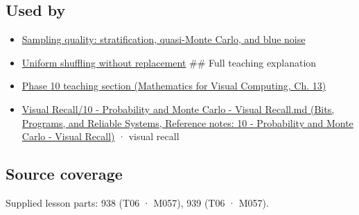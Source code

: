 \subsection{Used by}\label{appendix-daaf25bfd3a0-used-by}

\hypertarget{appendix-daaf25bfd3a0-used-by}{}

\begin{itemize}
\item
  \hyperref[appendix-9f693ffd82bc]{Sampling quality: stratification, quasi-Monte Carlo, and blue noise}
\item
  \hyperref[appendix-184fcc411663]{Uniform shuffling without replacement} \#\# Full teaching explanation
\item
  \href{../02-Mathematics-for-Visual-Computing/main.pdf\#nameddest=02-foundations-ii-ch029-a-computer-produces-deterministic-pseudorandom-sequences}{Phase 10 teaching section (Mathematics for Visual Computing, Ch. 13)}
\item
  \href{../01-Bits-Programs-and-Reliable-Systems/main.pdf\#nameddest=appendix-cb5af353ef77}{Visual Recall/10 - Probability and Monte Carlo - Visual Recall.md (Bits, Programs, and Reliable Systems, Reference notes: 10 - Probability and Monte Carlo - Visual Recall)} · visual recall
\end{itemize}

\subsection{Source coverage}\label{appendix-daaf25bfd3a0-source-coverage}

\hypertarget{appendix-daaf25bfd3a0-source-coverage}{}

Supplied lesson parts: 938 (T06 · M057), 939 (T06 · M057).
